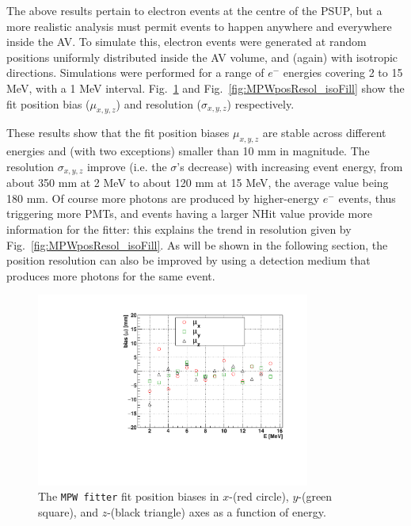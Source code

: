 The above results pertain to electron events at the centre of the PSUP, but a more realistic analysis must permit events to happen anywhere and everywhere inside the AV. To simulate this, electron events were generated at random positions uniformly distributed inside the AV volume, and (again) with isotropic directions. Simulations were performed for a range of $e^-$ energies covering 2 to 15 MeV, with a 1 MeV interval. Fig.~\ref{fig:MPWposBias_isoFill} and Fig.~\ref{fig:MPWposResol_isoFill} show the fit position bias ($\mu_{x,y,z}$) and resolution ($\sigma_{x,y,z}$) respectively. 

These results show that the fit position biases $\mu_{x,y,z}$ are stable across different energies and (with two exceptions) smaller than 10 mm in magnitude. The resolution $\sigma_{x,y,z}$ improve (i.e. the $\sigma$'s decrease) with increasing event energy, from about 350 mm at 2 MeV to about 120 mm at 15 MeV, the average value being 180 mm. Of course more photons are produced by higher-energy $e^-$ events, thus triggering more PMTs, and events having a larger NHit value provide more information for the fitter: this explains the trend in resolution given by Fig.~\ref{fig:MPWposResol_isoFill}. As will be shown in the following section, the position resolution can also be improved by using a detection medium that produces more photons for the same event. 

\begin{figure}[htbp]
	\centering	
	\includegraphics[width=9cm]{MPW_isoFill_posBiasVsE.pdf}
	\caption[The \texttt{MPW fitter} fit position biases ($\mu_{x,y,z}$) as a function of energy.]{The \texttt{MPW fitter} fit position biases in $x$-(red circle), $y$-(green square), and $z$-(black triangle) axes as a function of energy. \label{fig:MPWposBias_isoFill}}
\end{figure}

